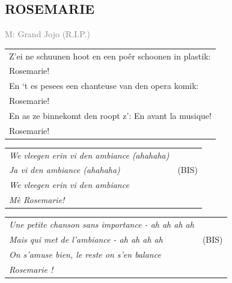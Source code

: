 \documentclass{article}
\begin{document}
\subsection*{ROSEMARIE}
\textcolor{gray}{\small M: Grand Jojo (R.I.P.)}\par
\begin{tabularx}{\textwidth}{>{\raggedright\arraybackslash}X}
    Z’ei ne schuunen hoot en een poêr schoonen in plastik:\\
Rosemarie!\\
En ‘t es pesees een chanteuse van den opera komik:\\
Rosemarie!\\
En as ze binnekomt den roopt z’: En avant la musique!\\
Rosemarie!\\
\end{tabularx}
\par
\begin{tabularx}{0.8\textwidth}{>{\raggedright\arraybackslash}X c}
    \textit{We vleegen erin vi den ambiance (ahahaha)}\\
\textit{Ja vi den ambiance (ahahaha)} & (BIS)\\
\textit{We vleegen erin vi den ambiance}\\
    \textit{Mè Rosemarie!}\\
\end{tabularx}
\par
{}
\begin{tabularx}{0.8\textwidth}{>{\raggedright\arraybackslash}X c}
    \textit{Une petite chanson sans importance - ah ah ah ah}\\
    \textit{Mais qui met de l'ambiance - ah ah ah ah} & (BIS)\\
    \textit{On s'amuse bien, le reste on s'en balance}\\
    \textit{Rosemarie !}\\
\end{tabularx}
\end{document}
